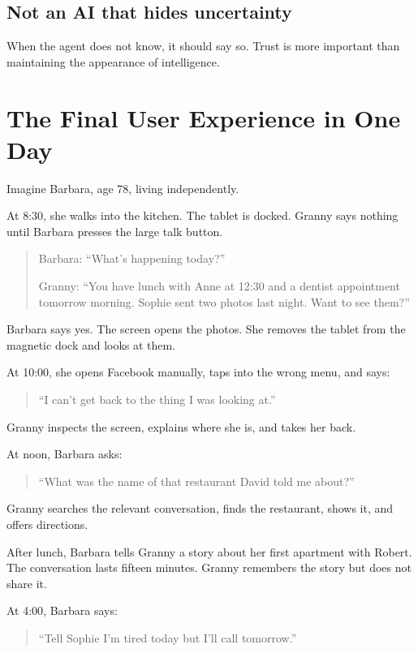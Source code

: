 \documentclass[11pt]{article}
\begin{document}
\subsection{Not an AI that hides uncertainty}
When the agent does not know, it should say so. Trust is more important than maintaining the appearance of intelligence.

\section{The Final User Experience in One Day}

Imagine Barbara, age 78, living independently.

At 8:30, she walks into the kitchen. The tablet is docked. Granny says nothing until Barbara presses the large talk button.

\begin{quote}
Barbara: ``What's happening today?''

Granny: ``You have lunch with Anne at 12:30 and a dentist appointment tomorrow morning. Sophie sent two photos last night. Want to see them?''
\end{quote}

Barbara says yes. The screen opens the photos. She removes the tablet from the magnetic dock and looks at them.

At 10:00, she opens Facebook manually, taps into the wrong menu, and says:

\begin{quote}
``I can't get back to the thing I was looking at.''
\end{quote}

Granny inspects the screen, explains where she is, and takes her back.

At noon, Barbara asks:

\begin{quote}
``What was the name of that restaurant David told me about?''
\end{quote}

Granny searches the relevant conversation, finds the restaurant, shows it, and offers directions.

After lunch, Barbara tells Granny a story about her first apartment with Robert. The conversation lasts fifteen minutes. Granny remembers the story but does not share it.

At 4:00, Barbara says:

\begin{quote}
``Tell Sophie I'm tired today but I'll call tomorrow.''
\end{quote}
\end{document}
